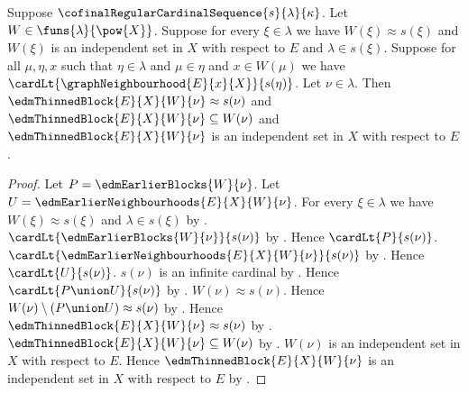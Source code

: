 \begin{theorem}\label{edm_thinned_block_large}
    Suppose $\cofinalRegularCardinalSequence{s}{\lambda}{\kappa}$.
    Let $W\in\funs{\lambda}{\pow{X}}$.
    Suppose for every $\xi\in\lambda$ we have
        $W(\xi)\approx s(\xi)$ and
        $W(\xi)$ is an independent set in $X$ with respect to $E$ and
        $\lambda\in s(\xi)$.
    Suppose for all $\mu,\eta,x$ such that $\eta\in\lambda$ and
        $\mu\in\eta$ and $x\in W(\mu)$ we have
        $\cardLt{\graphNeighbourhood{E}{x}{X}}{s(\eta)}$.
    Let $\nu\in\lambda$.
    Then $\edmThinnedBlock{E}{X}{W}{\nu}\approx s(\nu)$ and
        $\edmThinnedBlock{E}{X}{W}{\nu}\subseteq W(\nu)$ and
        $\edmThinnedBlock{E}{X}{W}{\nu}$ is an independent set in $X$
            with respect to $E$.
\end{theorem}
\begin{proof}
    Let $P=\edmEarlierBlocks{W}{\nu}$.
    Let $U=\edmEarlierNeighbourhoods{E}{X}{W}{\nu}$.
    For every $\xi\in\lambda$ we have
        $W(\xi)\approx s(\xi)$ and $\lambda\in s(\xi)$ by
        \auto.
    $\cardLt{\edmEarlierBlocks{W}{\nu}}{s(\nu)}$ by
        .
    Hence $\cardLt{P}{s(\nu)}$.
    $\cardLt{\edmEarlierNeighbourhoods{E}{X}{W}{\nu}}{s(\nu)}$ by
        .
    Hence $\cardLt{U}{s(\nu)}$.
    $s(\nu)$ is an infinite cardinal by
        .
    Hence $\cardLt{P\union U}{s(\nu)}$ by
        .
    $W(\nu)\approx s(\nu)$.
    Hence $W(\nu)\setminus(P\union U)\approx s(\nu)$ by
        .
    Hence $\edmThinnedBlock{E}{X}{W}{\nu}\approx s(\nu)$ by
        .
    $\edmThinnedBlock{E}{X}{W}{\nu}\subseteq W(\nu)$ by
        .
    $W(\nu)$ is an independent set in $X$ with respect to $E$.
    Hence $\edmThinnedBlock{E}{X}{W}{\nu}$ is an independent set in $X$
        with respect to $E$ by
        .
\end{proof}

